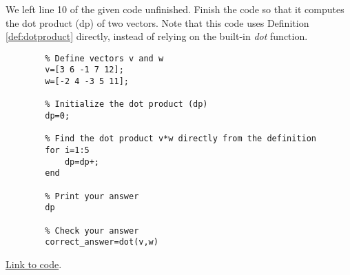 \documentclass{ximera}
\begin{document}
\begin{problem}\label{prob_oct_vec_loop}
    We left line 10 of the given code unfinished.  Finish the code so that it computes the dot product (dp) of two vectors.  Note that this code uses Definition \ref{def:dotproduct} directly, instead of relying on the built-in \emph{dot} function.

    \begin{verbatim}
        % Define vectors v and w
        v=[3 6 -1 7 12];
        w=[-2 4 -3 5 11];

        % Initialize the dot product (dp)
        dp=0;

        % Find the dot product v*w directly from the definition
        for i=1:5
            dp=dp+;
        end

        % Print your answer
        dp

        % Check your answer
        correct_answer=dot(v,w)
    \end{verbatim}

    \href{https://sagecell.sagemath.org/?z=eJxdjssKwjAQRfeB_MPdFHwVjPUBSlaK4M59EZEmxWBNyhgT9OtNqRud3cy9nDkZdro2ViPoyjt6IOBiFSJnQZYFlsgFVhCz04azKMt8hjnyAgsI0Z04y3CwxptLY94a_qqhnEdLTj0rj4Fqh5ypVk6_3b1J8P9WGEUoQ0mgeaEmd-8bnVciO8tZ7QhGivWCM6RJQNWOE1Jb1XOPZKzHyz0p6T-ipu5rH22vurr9RpWj7tu532VyGYRJHH4ATLJPyQ==&lang=octave&interacts=eJyLjgUAARUAuQ==}{Link to code}.

\end{problem}
 
\end{document}
